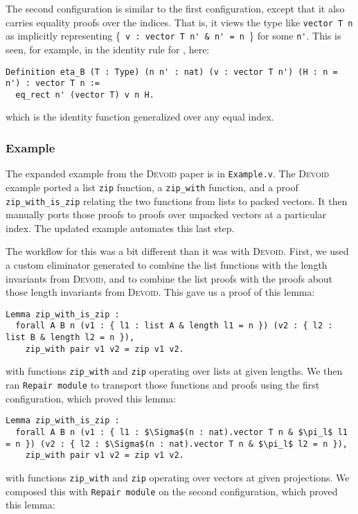 The second configuration is similar to the first configuration, except that it also carries equality proofs over the indices.
That is, it views the type \B like \lstinline{vector T n} as implicitly representing \{\lstinline{ v : vector T n' & n' = n }\} for some \lstinline{n'}.
This is seen, for example, in the identity rule for \B, here: 

\begin{lstlisting}
Definition eta_B (T : Type) (n n' : nat) (v : vector T n') (H : n = n') : vector T n :=
  eq_rect n' (vector T) v n H.
\end{lstlisting}
which is the identity function generalized over any equal index.

\subsubsection{Example}

The expanded example from the \textsc{Devoid} paper is in \lstinline{Example.v}.
The \textsc{Devoid} example ported a list \lstinline{zip} function,
a \lstinline{zip_with} function, and a proof \lstinline{zip_with_is_zip} relating the two
functions from lists to packed vectors.
It then manually ports those proofs to proofs over unpacked vectors at a particular index.
The updated \toolname example automates this last step.

The workflow for this was a bit different than it was with \textsc{Devoid}.
First, we used a custom eliminator \toolname generated to combine the list functions
with the length invariants from \textsc{Devoid}, and to combine the list proofs
with the proofs about those length invariants from \textsc{Devoid}.
This gave us a proof of this lemma:

\begin{lstlisting}
Lemma zip_with_is_zip :
  forall A B n (v1 : { l1 : list A & length l1 = n }) (v2 : { l2 : list B & length l2 = n }),
    zip_with pair v1 v2 = zip v1 v2.
\end{lstlisting}
with functions \lstinline{zip_with} and \lstinline{zip} operating over lists at given lengths.
We then ran \lstinline{Repair module} to transport those functions and proofs using the first
configuration, which proved this lemma:

\begin{lstlisting}
Lemma zip_with_is_zip :
  forall A B n (v1 : { l1 : $\Sigma$(n : nat).vector T n & $\pi_l$ l1 = n }) (v2 : { l2 : $\Sigma$(n : nat).vector T n & $\pi_l$ l2 = n }),
    zip_with pair v1 v2 = zip v1 v2.
\end{lstlisting}
with functions \lstinline{zip_with} and \lstinline{zip} operating over vectors at given projections.
We composed this with \lstinline{Repair module} on the second configuration,
which proved this lemma:

